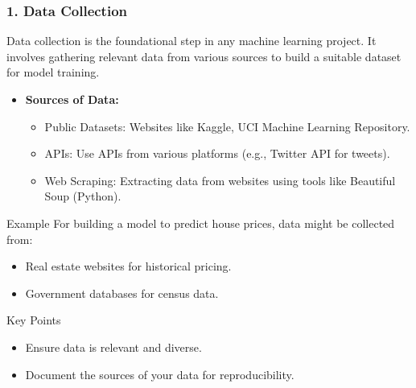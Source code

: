 \documentclass[aspectratio=169]{beamer}
\begin{document}
\begin{frame}
    \frametitle{1. Data Collection}
    Data collection is the foundational step in any machine learning project. It involves gathering relevant data from various sources to build a suitable dataset for model training.
    
    \begin{itemize}
        \item \textbf{Sources of Data:}
        \begin{itemize}
            \item Public Datasets: Websites like Kaggle, UCI Machine Learning Repository.
            \item APIs: Use APIs from various platforms (e.g., Twitter API for tweets).
            \item Web Scraping: Extracting data from websites using tools like Beautiful Soup (Python).
        \end{itemize}
    \end{itemize}

    \begin{block}{Example}
        For building a model to predict house prices, data might be collected from:
        \begin{itemize}
            \item Real estate websites for historical pricing.
            \item Government databases for census data.
        \end{itemize}
    \end{block}
    
    \begin{block}{Key Points}
        \begin{itemize}
            \item Ensure data is relevant and diverse.
            \item Document the sources of your data for reproducibility.
        \end{itemize}
    \end{block}
\end{frame}
\end{document}
